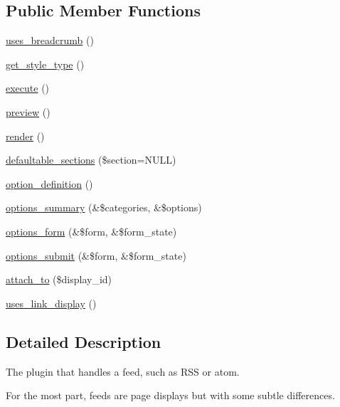 \subsection*{Public Member Functions}
\begin{CompactItemize}
\item 
\hyperlink{classviews__plugin__display__feed_4bc729e21f5578c13d420bbaf3c388c5}{uses\_\-breadcrumb} ()
\item 
\hyperlink{classviews__plugin__display__feed_9a7886409056fe5906021a70d2f41c14}{get\_\-style\_\-type} ()
\item 
\hyperlink{classviews__plugin__display__feed_6bfa566313f3f8fba85751554567e2dd}{execute} ()
\item 
\hyperlink{classviews__plugin__display__feed_e5e20d2999e052f50486b5d03b4fb105}{preview} ()
\item 
\hyperlink{classviews__plugin__display__feed_661fe08fd1be956d5b5cc40f36daf26b}{render} ()
\item 
\hyperlink{classviews__plugin__display__feed_adbff7e4fb0bc05dfee8bc38ea1349dc}{defaultable\_\-sections} (\$section=NULL)
\item 
\hyperlink{classviews__plugin__display__feed_9f737ab801100dafa8f1020c0737b598}{option\_\-definition} ()
\item 
\hyperlink{classviews__plugin__display__feed_5c0b5faad36090985c85b16a454023a6}{options\_\-summary} (\&\$categories, \&\$options)
\item 
\hyperlink{classviews__plugin__display__feed_be0a41d577b52de992279986d6c8c2d9}{options\_\-form} (\&\$form, \&\$form\_\-state)
\item 
\hyperlink{classviews__plugin__display__feed_b7cca15934456ddb26045f03483899fb}{options\_\-submit} (\&\$form, \&\$form\_\-state)
\item 
\hyperlink{classviews__plugin__display__feed_ea8b688de38f11854afdb4194e87f59d}{attach\_\-to} (\$display\_\-id)
\item 
\hyperlink{classviews__plugin__display__feed_a61e05dca3b82b696f6ea10356873a8b}{uses\_\-link\_\-display} ()
\end{CompactItemize}


\subsection{Detailed Description}
The plugin that handles a feed, such as RSS or atom.

For the most part, feeds are page displays but with some subtle differences. 

